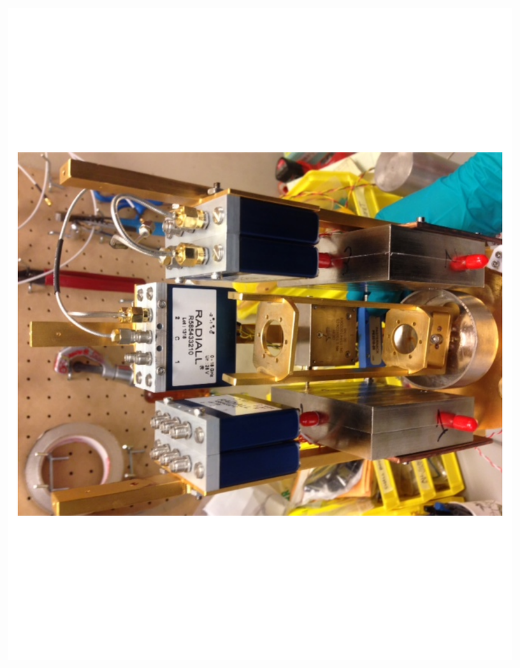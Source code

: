 \documentclass{beamer}
\begin{document}
\begin{frame}
\begin{columns}
\includegraphics[width=1.1\textwidth, angle=-90]{another_view}

\end{columns}
\end{frame}
\end{document}
